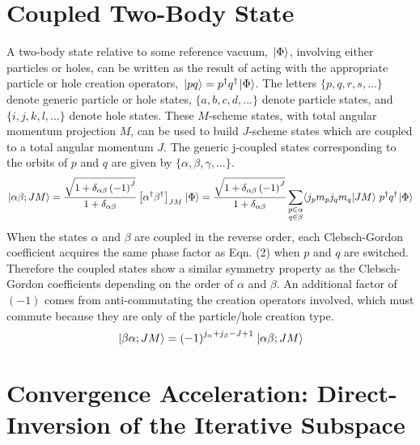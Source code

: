 \documentclass[thesis.tex]{subfiles}
\begin{document}
\chapter{Coupled Two-Body State}

A two-body state relative to some reference vacuum, $\hspace{1pt}\lvert \Phi \rangle$, involving either particles or holes, can be written as the result of acting with the appropriate particle or hole creation operators, $\hspace{1pt}\lvert pq \rangle=p^{\dagger}q^{\dagger}\hspace{1pt}\lvert \Phi \rangle$. The letters $\{p,q,r,s,...\}$ denote generic particle or hole states, $\{a,b,c,d,...\}$ denote particle states, and $\{i,j,k,l,...\}$ denote hole states. These $M$-scheme states, with total angular momentum projection $M$, can be used to build $J$-scheme states which are coupled to a total angular momentum $J$. The generic j-coupled states corresponding to the orbits of $p$ and $q$ are given by $\{\alpha,\beta,\gamma,...\}$.
\begin{equation}
\ket{\alpha\beta;JM}=\frac{\sqrt{1+\delta_{\alpha\beta}\left(-1\right)^{J}}}{1+\delta_{\alpha\beta}}\left[\alpha^{\dagger}\beta^{\dagger}\right]_{JM}\ket{\Phi}=\frac{\sqrt{1+\delta_{\alpha\beta}\left(-1\right)^{J}}}{1+\delta_{\alpha\beta}}\sum_{\substack{p\in\alpha \\ q\in\beta}}\braket{j_{p}m_{p}j_{q}m_{q}}{JM}\ p^{\dagger}q^{\dagger}\ket{\Phi}
\end{equation}
When the states $\alpha$ and $\beta$ are coupled in the reverse order, each Clebsch-Gordon coefficient acquires the same phase factor as Eqn. (2) when $p$ and $q$ are switched. Therefore the coupled states show a similar symmetry property as the Clebsch-Gordon coefficients depending on the order of $\alpha$ and $\beta$. An additional factor of $\left(-1\right)$ comes from anti-commutating the creation operators involved, which must commute because they are only of the particle/hole creation type.
\begin{equation}
\hspace{1pt}\lvert \beta\alpha;JM \rangle=\left(-1\right)^{j_{\alpha}+j_{\beta}-J+1}\hspace{1pt}\lvert \alpha\beta;JM \rangle
\end{equation}

\chapter{Convergence Acceleration: Direct-Inversion of the Iterative Subspace}
\end{document}
